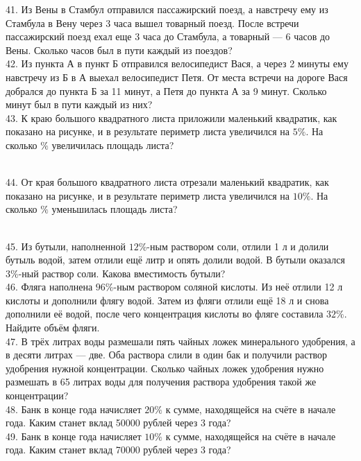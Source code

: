 41. Из Вены в Стамбул отправился пассажирский поезд, а навстречу ему из Стамбула в Вену через 3 часа вышел товарный поезд. После встречи пассажирский поезд ехал еще 3 часа до Стамбула, а товарный ---
6 часов до Вены. Сколько часов был в пути каждый из поездов?\\
42. Из пункта А в пункт Б отправился велосипедист Вася, а через 2 минуты ему навстречу из Б в А выехал велосипедист Петя. От места встречи на дороге Вася добрался до пункта Б за 11 минут, а Петя до пункта А за 9 минут. Сколько минут был в пути каждый из них?\\
43. К краю большого квадратного листа приложили маленький квадратик, как показано на рисунке, и в результате периметр листа увеличился на $5\%.$ На сколько $\%$ увеличилась площадь листа?
\begin{figure}[h]
\end{figure}\\
44. От края большого квадратного листа отрезали маленький квадратик, как показано на рисунке, и в результате периметр листа увеличился на $10\%.$ На сколько $\%$ уменьшилась площадь листа?
\begin{figure}[h]
\end{figure}\\
45. Из бутыли, наполненной $12\%$-ным раствором соли, отлили 1 л и долили бутыль водой, затем отлили ещё литр и опять долили водой. В бутыли оказался $3\%$-ный раствор соли. Какова вместимость бутыли?\\
46. Фляга наполнена $96\%$-ным раствором соляной кислоты. Из неё отлили 12 л кислоты и дополнили флягу водой. Затем из фляги отлили ещё 18 л и снова дополнили её водой, после чего концентрация кислоты во фляге составила $32\%.$ Найдите объём фляги.\\
47. В трёх литрах воды размешали пять чайных ложек минерального удобрения, а в десяти литрах --- две. Оба раствора слили в один бак и получили раствор удобрения нужной концентрации. Сколько чайных ложек удобрения нужно размешать в 65 литрах воды для получения раствора удобрения такой же концентрации?\\
48. Банк в конце года начисляет $20\%$ к сумме, находящейся на счёте в начале года. Каким станет вклад 50000 рублей через 3 года?\\
49. Банк в конце года начисляет $10\%$ к сумме, находящейся на счёте в начале года. Каким станет вклад 70000 рублей через 3 года?\\
